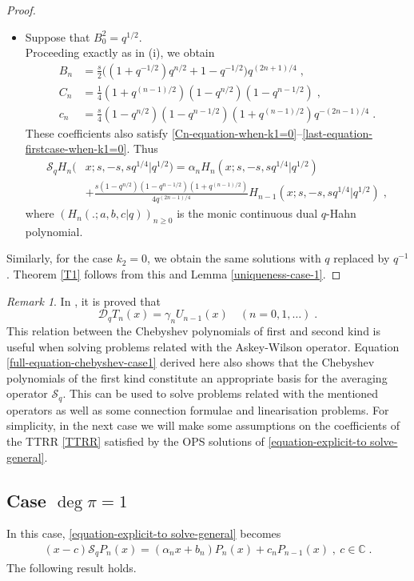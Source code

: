 \documentclass{amsart}
\theoremstyle{remark}
\newtheorem{remark}[theorem]{Remark}
\numberwithin{equation}{section}
\begin{document}
\begin{proof}
\begin{itemize}
\item[ii-] Suppose that $B_0^2=q^{1/2}$.\\
Proceeding exactly as in (i), we obtain 
\begin{align}
B_n&=\frac{s}{2}\Big((1+q^{-1/2})q^{n/2} +1-q^{-1/2}\Big)q^{(2n+1)/4}\;,\label{Bn-solution-continuous-dual-q-hahn}\\
C_n&=\frac{1}{4}(1+q^{(n-1)/2})(1-q^{n/2})(1-q^{n-1/2})\;,\label{Cn-solution-continuous-dual-qhahn}\\
c_n&=\frac{s}{4}(1-q^{n/2})(1-q^{n-1/2})(1+q^{(n-1)/2})q^{-(2n-1)/4}\;.\label{cn-solution-continuous-dual-qhahn}
\end{align}
These coefficients also satisfy \eqref{Cn-equation-when-k1=0}--\eqref{last-equation-firstcase-when-k1=0}. Thus 
\begin{align}
\mathcal{S}_qH_n(&x;s,-s,sq^{1/4}|q^{1/2})=\alpha_nH_n(x;s,-s,sq^{1/4}|q^{1/2})\label{full-equation-for-continuousdual-qhahn-firstcase}\\
&+\frac{s(1-q^{n/2})(1-q^{n-1/2})(1+q^{(n-1)/2})}{4q^{(2n-1)/4}}H_{n-1}(x;s,-s,sq^{1/4}|q^{1/2}) \;,\nonumber
\end{align}
where $(H_n(.;a,b,c|q))_{n\geq 0}$ is the monic continuous dual $q$-Hahn polynomial.
\end{itemize}

Similarly, for the case $k_2=0$, we obtain the same solutions with $q$ replaced by $q^{-1}$. Theorem \ref{T1} follows from this and Lemma \ref{uniqueness-case-1}.  
\end{proof}
\begin{remark}\label{remark-intro}
In \cite[p.301]{IsmailBook2005}, it is proved that 
$$\mathcal{D}_qT_n(x)=\gamma_n U_{n-1}(x) \quad (n=0,1,\ldots)\;.$$
This relation between the Chebyshev polynomials of first and second kind is useful when solving problems related with the Askey-Wilson operator. Equation \eqref{full-equation-chebyshev-case1} derived here also shows that the Chebyshev polynomials of the first kind constitute an appropriate basis for the averaging operator $\mathcal{S}_q$. This can be used to solve problems related with the mentioned operators as well as some connection formulae and linearisation problems. For simplicity, in the next case we will make some assumptions on the coefficients of the TTRR \eqref{TTRR} satisfied by the OPS solutions of \eqref{equation-explicit-to solve-general}.
\end{remark}

\subsection*{Case $\deg \pi =1$}
In this case, \eqref{equation-explicit-to solve-general} becomes 
\begin{align}\label{lastcase-deg-pi-is-2}
(x-c)\mathcal{S}_qP_n(x)=(\alpha_nx+b_n)P_n(x)+c_nP_{n-1}(x)\;,~c\in \mathbb{C}\;.
\end{align}
The following result holds.
\end{document}
